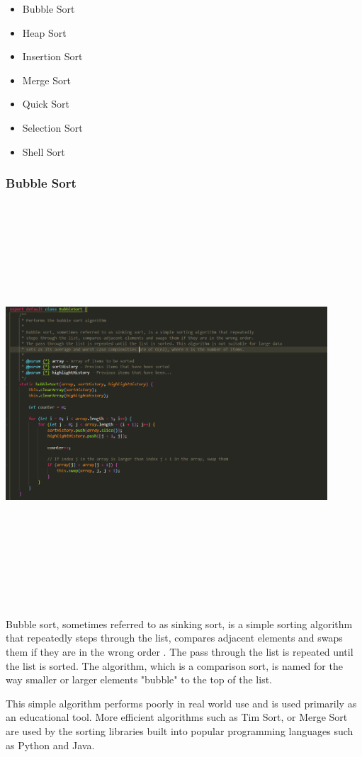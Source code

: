 \begin{itemize}
    \item Bubble Sort
    \item Heap Sort
    \item Insertion Sort
    \item Merge Sort
    \item Quick Sort
    \item Selection Sort
    \item Shell Sort
\end{itemize}

\subsubsection{Bubble Sort}
\begin{center}
    \includegraphics[width=12cm,height=15cm,keepaspectratio]{images/bubblesort}
\end{center}
Bubble sort, sometimes referred to as sinking sort, is a simple sorting algorithm that repeatedly steps through the list, compares adjacent elements and swaps them if they are in the wrong order \cite{bubble_sort}. The pass through the list is repeated until the list is sorted. The algorithm, which is a comparison sort, is named for the way smaller or larger elements "bubble" to the top of the list.
\par
\bigskip
This simple algorithm performs poorly in real world use and is used primarily as an educational tool. More efficient algorithms such as Tim Sort, or Merge Sort are used by the sorting libraries built into popular programming languages such as Python and Java.

